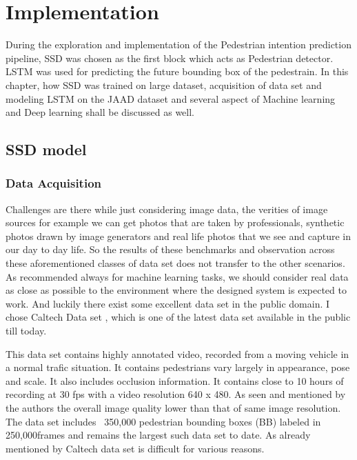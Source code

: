 \chapter{Implementation}
During the exploration and implementation of the Pedestrian intention prediction pipeline, SSD was chosen as the first block which acts as Pedestrian detector. LSTM was used for predicting the future bounding box of the pedestrain. In this chapter, how SSD was trained on large dataset, acquisition of data set and modeling LSTM on the JAAD dataset and several aspect of Machine learning and Deep learning shall be discussed as well.
\section{SSD model}

\subsection{Data Acquisition}
Challenges are there while just considering image data, the verities of image sources for example we can get photos that are taken by professionals, synthetic photos drawn by image generators and real life photos that we see and capture in our day to day life. So the results of these benchmarks and 
observation across these aforementioned classes of data set does not transfer to the other scenarios.
As recommended always for machine learning tasks, we should consider real data as close as possible to the environment where the designed system is expected to work. And luckily there exist some excellent data set in the public domain. I chose Caltech Data set \cite{dollar2009pedestrian}, which is one of the latest data set available in the public till today. 

\newpara
This data set contains highly annotated video, recorded from a moving vehicle in a normal trafic situation. It contains pedestrians vary largely in appearance, pose and scale. It also includes occlusion information. It contains close to 10 hours of recording at 30 fps with a video resolution 640 x 480. As seen and mentioned by the authors the overall image quality lower than that of same image resolution. The data set includes ~350,000  pedestrian bounding boxes (BB) labeled in 250,000frames and remains the largest such data set to  date. As already mentioned by \cite{walk2010new} Caltech data set is difficult for various reasons.

